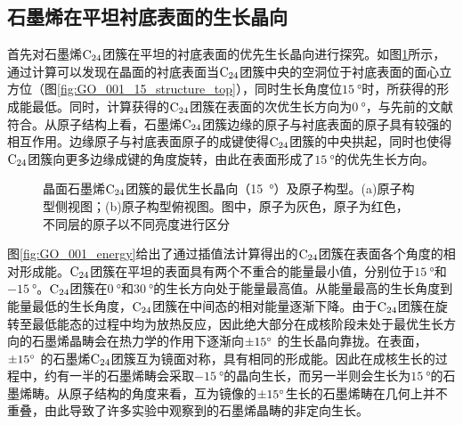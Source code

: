\subsection{石墨烯在平坦衬底表面的生长晶向}
首先对石墨烯$\rm{C_{24}}$团簇在平坦的衬底表面的优先生长晶向进行探究。如图\ref{fig:GO_001_15_structure}所示，通过计算可以发现在晶面的衬底表面当$\rm{C_{24}}$团簇中央的空洞位于衬底表面的面心立方位（图\ref{fig:GO_001_15_structure_top}），同时生长角度位$\SI{15}{\degree}$时，所获得的形成能最低。同时，计算获得的$\rm{C_{24}}$团簇在表面的次优生长方向为$\SI{0}{\degree}$，与先前的文献符合。从原子结构上看，石墨烯$\rm{C_{24}}$团簇边缘的原子与衬底表面的原子具有较强的相互作用。边缘原子与衬底表面原子的成键使得$\rm{C_{24}}$团簇的中央拱起，同时也使得$\rm{C_{24}}$团簇向更多边缘成键的角度旋转，由此在表面形成了$\SI{15}{\degree}$的优先生长方向。

\begin{figure}[htb]

    \caption{晶面石墨烯$\rm{C_{24}}$团簇的最优生长晶向（\SI{15}{\degree}）及原子构型。(a)原子构型侧视图；(b)原子构型俯视图。图中，原子为灰色，原子为红色，不同层的原子以不同亮度进行区分}
    \label{fig:GO_001_15_structure}
\end{figure}

图\ref{fig:GO_001_energy}给出了通过插值法计算得出的$\rm{C_{24}}$团簇在表面各个角度的相对形成能。$\rm{C_{24}}$团簇在平坦的表面具有两个不重合的能量最小值，分别位于$\SI{+15}{\degree}$和$\SI{-15}{\degree}$。$\rm{C_{24}}$团簇在$\SI{0}{\degree}$和$\SI{30}{\degree}$的生长方向处于能量最高值。从能量最高的生长角度到能量最低的生长角度，$\rm{C_{24}}$团簇在中间态的相对能量逐渐下降。由于$\rm{C_{24}}$团簇在旋转至最低能态的过程中均为放热反应，因此绝大部分在成核阶段未处于最优生长方向的石墨烯晶畴会在热力学的作用下逐渐向$\SI{\pm 15}{\degree}$ 的生长晶向靠拢。在表面，$\SI{\pm 15}{\degree}$ 的石墨烯$\rm{C_{24}}$团簇互为镜面对称，具有相同的形成能。因此在成核生长的过程中，约有一半的石墨烯畴会采取$\SI{-15}{\degree}$的晶向生长，而另一半则会生长为$\SI{+15}{\degree}$的石墨烯畴。从原子结构的角度来看，互为镜像的$\SI{\pm 15}{\degree}$生长的石墨烯畴在几何上并不重叠，由此导致了许多实验中观察到的石墨烯晶畴的非定向生长。

